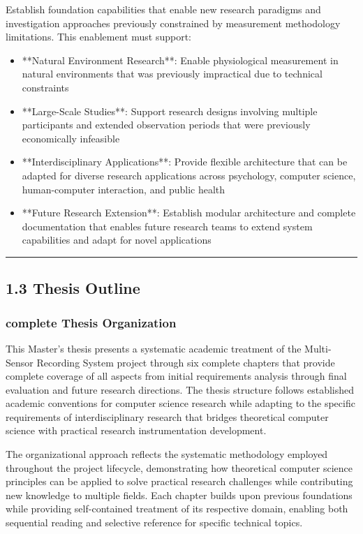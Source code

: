 \documentclass[11pt,a4paper]{article}
\begin{document}
Establish foundation capabilities that enable new research paradigms and
investigation approaches previously constrained
by measurement methodology limitations. This enablement must support:

\begin{itemize}
\item **Natural Environment Research**: Enable physiological measurement in natural environments that was previously
  impractical due to technical constraints
\item **Large-Scale Studies**: Support research designs involving multiple participants and extended observation periods
  that were previously economically infeasible
\item **Interdisciplinary Applications**: Provide flexible architecture that can be adapted for diverse research
  applications across psychology, computer science, human-computer interaction, and
  public health
\item **Future Research Extension**: Establish modular architecture and complete documentation that enables future
  research teams to extend system capabilities and adapt for novel applications

\end{itemize}
\hrule

\subsection{1.3 Thesis Outline}

\subsubsection{complete Thesis Organization}

This Master's thesis presents a systematic academic treatment of the Multi-Sensor
Recording System project through six
complete chapters that provide complete coverage of all aspects from initial
requirements analysis through final
evaluation and future research directions.  The thesis structure follows established
academic conventions for computer
science research while adapting to the specific requirements of interdisciplinary
research that bridges theoretical
computer science with practical research instrumentation development.

The organizational approach reflects the systematic methodology employed throughout
the project lifecycle, demonstrating
how theoretical computer science principles can be applied to solve practical
research challenges while contributing new
knowledge to multiple fields.  Each chapter builds upon previous foundations while
providing self-contained treatment of
its respective domain, enabling both sequential reading and selective reference for
specific technical topics.
\end{document}
